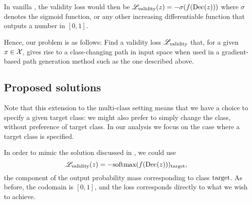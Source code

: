 \documentclass[../main.tex]{subfiles}
\begin{document}
In vanilla \ls{}, the validity loss would then be $\mathscr{L}_\text{validity}(z) = - \sigma(f(\operatorname{Dec}(z)))$ where $\sigma$ denotes the sigmoid function, or any other increasing differentiable function that outputs a number in $[0, 1]$.

Hence, our problem is as follows:
Find a validity loss $\mathscr{L}_\text{validity}$ that, for a given $x \in \mathcal{X}$, gives rise to a class-changing path in input space when used in a gradient-based path generation method such as the one described above.

\subsection{Proposed solutions}

Note that this extension to the multi-class setting means that we have a choice to specify a given target class: we might also prefer to simply change the class, without preference of target class. In our analysis we focus on the case where a target class is specified.

In order to mimic the solution discussed in \cite{cohenGifsplanation2022}, we could use
\begin{equation}
    \mathscr{L}_\text{validity}(z) = -\text{softmax}(f(\operatorname{Dec}(z)))_{\mathrm{target}},
\end{equation}
\ie{} the component of the output probability mass corresponding to class $\mathrm{target}$.
As before, the codomain is $[0, 1]$, and the loss corresponds directly to what we wish to achieve.




\end{document}
